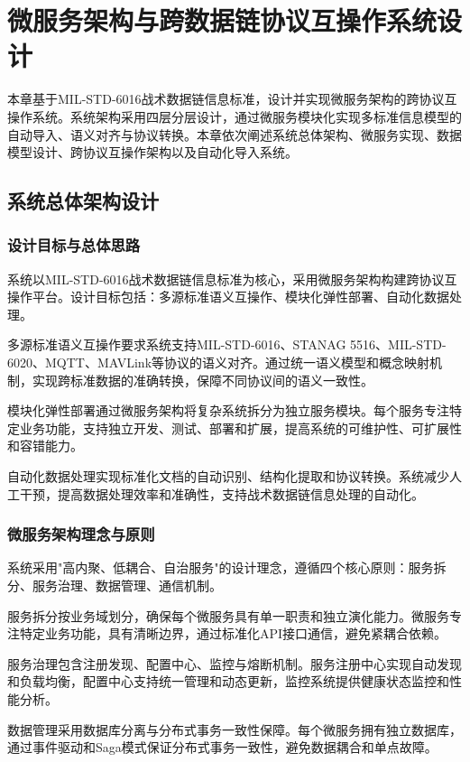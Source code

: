 \chapter{微服务架构与跨数据链协议互操作系统设计}

本章基于MIL-STD-6016战术数据链信息标准，设计并实现微服务架构的跨协议互操作系统。系统架构采用四层分层设计，通过微服务模块化实现多标准信息模型的自动导入、语义对齐与协议转换。本章依次阐述系统总体架构、微服务实现、数据模型设计、跨协议互操作架构以及自动化导入系统。

\section{系统总体架构设计}

\subsection{设计目标与总体思路}

系统以MIL-STD-6016战术数据链信息标准为核心，采用微服务架构构建跨协议互操作平台。设计目标包括：多源标准语义互操作、模块化弹性部署、自动化数据处理。

多源标准语义互操作要求系统支持MIL-STD-6016、STANAG 5516、MIL-STD-6020、MQTT、MAVLink等协议的语义对齐。通过统一语义模型和概念映射机制，实现跨标准数据的准确转换，保障不同协议间的语义一致性。

模块化弹性部署通过微服务架构将复杂系统拆分为独立服务模块。每个服务专注特定业务功能，支持独立开发、测试、部署和扩展，提高系统的可维护性、可扩展性和容错能力。

自动化数据处理实现标准化文档的自动识别、结构化提取和协议转换。系统减少人工干预，提高数据处理效率和准确性，支持战术数据链信息处理的自动化。

\subsection{微服务架构理念与原则}

系统采用"高内聚、低耦合、自治服务"的设计理念，遵循四个核心原则：服务拆分、服务治理、数据管理、通信机制。

服务拆分按业务域划分，确保每个微服务具有单一职责和独立演化能力。微服务专注特定业务功能，具有清晰边界，通过标准化API接口通信，避免紧耦合依赖。

服务治理包含注册发现、配置中心、监控与熔断机制。服务注册中心实现自动发现和负载均衡，配置中心支持统一管理和动态更新，监控系统提供健康状态监控和性能分析。

数据管理采用数据库分离与分布式事务一致性保障。每个微服务拥有独立数据库，通过事件驱动和Saga模式保证分布式事务一致性，避免数据耦合和单点故障。

